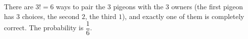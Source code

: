 There are $3!=6$ ways to pair the $3$ pigeons with the $3$ owners (the first pigeon has $3$ choices, the second $2$, the third $1$), and exactly one of them is completely correct. The probability is $\boxed{\dfrac{1}{6}}$.
